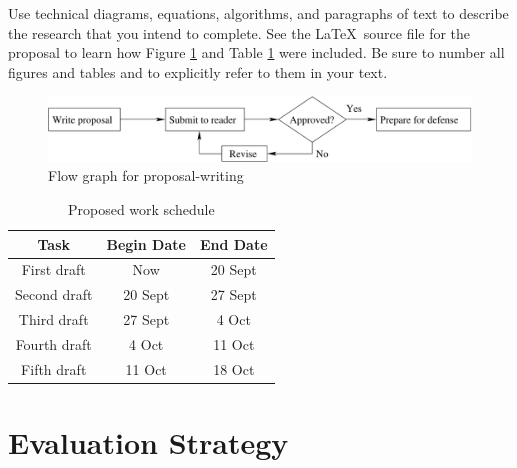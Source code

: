 \documentclass[11pt]{article}
\begin{document}

Use technical diagrams, equations, algorithms, and paragraphs of text
to describe the research that you intend to complete. See the \LaTeX\ source
file for the proposal to learn how Figure \ref{intro-fig1} and Table
\ref{intro-tab1} were included. Be sure to number all figures and tables and to
explicitly refer to them in your text.

\begin{figure}[htbp]
\centering
\includegraphics[width=5in]{flow.pdf}
\caption{Flow graph for proposal-writing}
\label{intro-fig1}
\end{figure}

\begin{table}[htbp]
\centering
\begin{tabular}{|c||c|c|}
\hline

\bf Task     & \bf Begin Date & \bf End Date \\ \hline\hline
First draft  & Now            & 20 Sept      \\ \hline
Second draft & 20 Sept        & 27 Sept      \\ \hline
Third draft  & 27 Sept        & 4 Oct        \\ \hline
Fourth draft & 4 Oct          & 11 Oct       \\ \hline
Fifth draft  & 11 Oct         & 18 Oct       \\ \hline

\end{tabular}
\caption{Proposed work schedule}
\label{intro-tab1}
\end{table}

\section{Evaluation Strategy}
\label{sec:evaluate}

\end{document}
